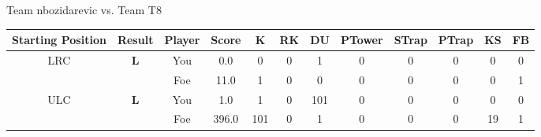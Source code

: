 \documentclass[a4paper,12pt]{article}
\begin{document}
  \vspace*{2em}
  \par {\large {\color{Gray} Team} nbozidarevic {\color{Gray}
      vs. Team} T8}
  \newline
  \begin{tabular}[t]{| c | c | c | c | c | c | c | c | c | c | c | c
      |}
    \hline
    Starting Position & \textbf{Result} & Player & \textbf{Score} & K & RK & DU & PTower & STrap & PTrap & KS & FB \\
    
      
                      
      
                      
      
        \hline
        \multirow{2}{*}{  LRC
             } &
              \multirow{2}{*}{  \textbf{L}  } & 
                    \cellcolor{yellow!25} You & \cellcolor{yellow!25} 0.0 & \cellcolor{yellow!25} 0 &
                    \cellcolor{yellow!25} 0 & \cellcolor{yellow!25} 1 & \cellcolor{yellow!25} 0 &
                    \cellcolor{yellow!25} 0 & \cellcolor{yellow!25} 0 & \cellcolor{yellow!25} 0 &
                    \cellcolor{yellow!25} 0 \\
                    \cline{3-12}
                    & & \cellcolor{red!15} Foe & \cellcolor{red!15} 11.0 & \cellcolor{red!15} 1 & \cellcolor{red!15}
                    0 & \cellcolor{red!15} 0
                    & \cellcolor{red!15} 0 & \cellcolor{red!15}
                    0 & \cellcolor{red!15} 0 
                    & \cellcolor{red!15} 0 & \cellcolor{red!15}
                    1 \\
                    
                      
      
                      
      
                      
      
                      
      
                      
      
                      
      
        \hline
        \multirow{2}{*}{  ULC  } &
              \multirow{2}{*}{  \textbf{L}  } & 
                    \cellcolor{yellow!25} You & \cellcolor{yellow!25} 1.0 & \cellcolor{yellow!25} 1 &
                    \cellcolor{yellow!25} 0 & \cellcolor{yellow!25} 101 & \cellcolor{yellow!25} 0 &
                    \cellcolor{yellow!25} 0 & \cellcolor{yellow!25} 0 & \cellcolor{yellow!25} 0 &
                    \cellcolor{yellow!25} 0 \\
                    \cline{3-12}
                    & & \cellcolor{red!15} Foe & \cellcolor{red!15} 396.0 & \cellcolor{red!15} 101 & \cellcolor{red!15}
                    0 & \cellcolor{red!15} 1
                    & \cellcolor{red!15} 0 & \cellcolor{red!15}
                    0 & \cellcolor{red!15} 0 
                    & \cellcolor{red!15} 19 & \cellcolor{red!15}
                    1 \\
                    

\end{tabular}
\end{document}
